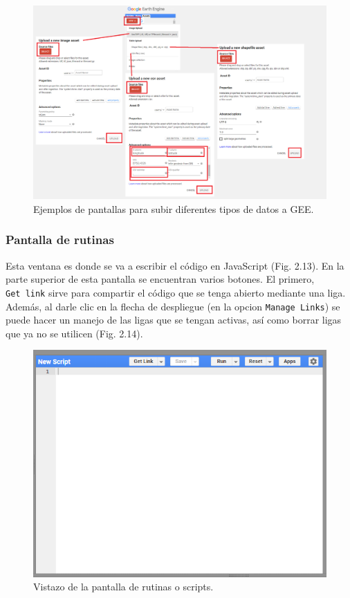 \documentclass[
  12pt,
  letterpaper,
  twoside]{book}
\begin{document}
\begin{figure}[btp]

{\centering \includegraphics[width=1\linewidth]{Img/newAssets} 

}

\caption{Ejemplos de pantallas para subir diferentes tipos de datos a GEE.}\label{fig:unnamed-chunk-13}
\end{figure}

\hypertarget{pantalla-de-rutinas}{%
\subsubsection*{Pantalla de rutinas}\label{pantalla-de-rutinas}}

Esta ventana es donde se va a escribir el código en JavaScript (Fig. 2.13). En la parte superior de esta pantalla se encuentran varios botones. El primero, \texttt{Get\ link} sirve para compartir el código que se tenga abierto mediante una liga. Además, al darle clic en la flecha de despliegue (en la opcion \texttt{Manage\ Links}) se puede hacer un manejo de las ligas que se tengan activas, así como borrar ligas que ya no se utilicen (Fig. 2.14).

\begin{figure}[btp]

{\centering \includegraphics[width=0.5\linewidth]{Img/editor} 

}

\caption{Vistazo de la pantalla de rutinas o scripts.}\label{fig:unnamed-chunk-14}
\end{figure}
\end{document}

